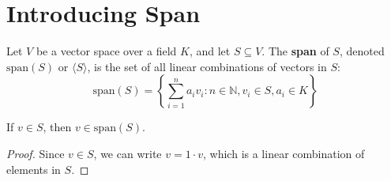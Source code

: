 \section{Introducing Span}

\begin{definition}
  \label{definition : span}
  \leanok
  Let $V$ be a vector space over a field $K$, and let $S \subseteq V$. The \textbf{span} of $S$, denoted $\text{span}(S)$ or $\langle S \rangle$, is the set of all linear combinations of vectors in $S$:
  $$\text{span}(S) = \left\{ \sum_{i=1}^{n} a_i v_i : n \in \mathbb{N}, v_i \in S, a_i \in K \right\}$$
\end{definition}

\begin{theorem}
  \label{theorem : mem_span_of_mem}
  \leanok
  If $v \in S$, then $v \in \text{span}(S)$.
\end{theorem}

\begin{proof}
  Since $v \in S$, we can write $v = 1 \cdot v$, which is a linear combination of elements in $S$.
\end{proof}